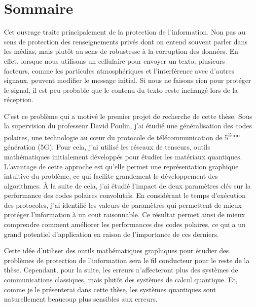\begin{comment}
\end{comment}

\clearpage  %
\chapter*{Sommaire}

Cet ouvrage traite principalement de la protection de l'information. Non pas au
sens de protection des renseignements privés dont on entend souvent parler
dans les médias,
mais plutôt au sens de robustesse à la corruption des données.
En effet, lorsque nous utilisons un cellulaire pour envoyer un texto, plusieurs
facteurs, comme les particules atmosphériques et l'interférence avec d'autres
signaux, peuvent modifier le message initial. Si nous ne faisons rien pour protéger le signal, 
il est peu probable que le contenu du texto reste inchangé lors de la réception.

C'est ce problème qui a motivé le premier projet de recherche de cette thèse.
Sous la supervision du professeur David Poulin, 
j'ai étudié une généralisation des codes polaires,
une technologie au cœur du protocole de télécommunication de 5\textsuperscript{ième} génération (5G). 
Pour cela, j'ai utilisé les réseaux de tenseurs, outils
mathématiques initialement développés pour étudier les matériaux quantiques.
L'avantage de cette approche est qu'elle permet une représentation graphique
intuitive du problème, ce qui facilite grandement le développement des algorithmes.
À la suite de cela,
j'ai étudié l'impact de deux paramètres clés sur la performance des 
codes polaires convolutifs.
En considérant le temps d'exécution des protocoles,
j'ai identifié les valeurs de paramètres qui permettent de mieux protéger 
l'information à un cout raisonnable.
Ce résultat permet ainsi de mieux comprendre comment améliorer les performances
des codes polaires, ce qui a un grand potentiel d'application en raison
de l'importance de ces derniers.

Cette idée d'utiliser des outils mathématiques graphiques pour étudier des
problèmes de protection de l'information sera le fil conducteur pour le reste de
la thèse. Cependant, pour la suite, les erreurs n'affecteront plus des systèmes
de communications classiques, mais plutôt des systèmes de calcul quantique.
Et, comme je le présenterai dans cette thèse, les systèmes quantiques sont
naturellement beaucoup plus sensibles aux erreurs.

